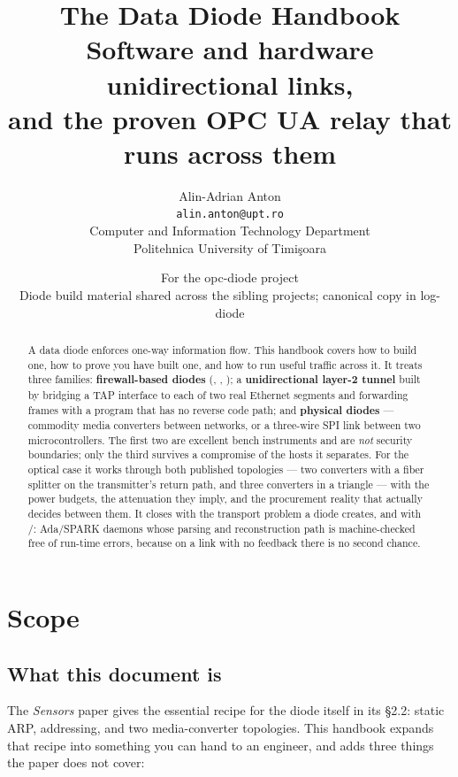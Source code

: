 \documentclass[11pt,a4paper]{article}
\title{\vspace{-12mm}\textbf{The Data Diode Handbook}\\[2mm]
       \large Software and hardware unidirectional links,\\
       \large and the proven OPC UA relay that runs across them}
\author{Alin-Adrian Anton \\
        \small \texttt{alin.anton@upt.ro} \\
        \small Computer and Information Technology Department\\
        \small Politehnica University of Timi\c{s}oara}
\date{\small For the opc-diode project\\
      \small Diode build material shared across the sibling
      projects; canonical copy in log-diode}
\renewcommand{\amp}{\prog{od\_sender}}
\renewcommand{\deamp}{\prog{od\_receiver}}
\begin{document}
\maketitle
\thispagestyle{fancy}

\begin{abstract}
\noindent
A data diode enforces one-way information flow. This handbook covers how to
build one, how to prove you have built one, and how to run useful traffic
across it. It treats three families: \textbf{firewall-based diodes}
(, , ); a \textbf{unidirectional
layer-2 tunnel} built by bridging a TAP interface to each of two real
Ethernet segments and forwarding frames with a program that has no reverse
code path; and \textbf{physical diodes} --- commodity media converters between
networks, or a three-wire SPI link between two microcontrollers. The first two
are excellent bench instruments and are \emph{not} security boundaries; only
the third survives a compromise of the hosts it separates. For the optical
case it works through both published topologies --- two converters with a
fiber splitter on the transmitter's return path, and three converters in a
triangle --- with the power budgets, the attenuation they imply, and the
procurement reality that actually decides between them. It closes with the
transport problem a diode creates, and with \amp{}/\deamp{}: Ada/SPARK
daemons whose parsing and reconstruction path is machine-checked free of
run-time errors, because on a link with no feedback there is no second
chance.
\end{abstract}

\vspace{2mm}
{\small\tableofcontents}
\clearpage

\section{Scope}

\subsection{What this document is}

The \emph{Sensors} paper \cite{anton2024} gives the essential recipe for
the diode itself in its \S2.2: static ARP, addressing,
and two media-converter topologies. This handbook expands that recipe into
something you can hand to an engineer, and adds three things the paper does
not cover:
\end{document}
